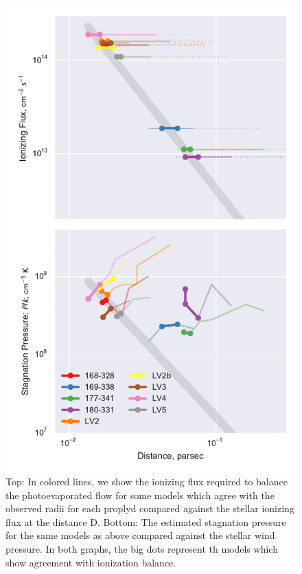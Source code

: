 \begin{figure}
\includegraphics[width=\linewidth]{../../proplyd-wind-figs/plot-wind-fits}
\caption{Top: In colored lines, we show the ionizing flux required to balance the photoevaporated flow for some models which agree with the observed radii for each proplyd compared against the stellar ionizing 
flux at the distance D.
Bottom: The estimated stagnation pressure for the same models as above compared against the stellar wind pressure.
In both graphs, the big dots represent th models which show agreement with ionization balance.}
\label{fig:pressure}
\end{figure}

